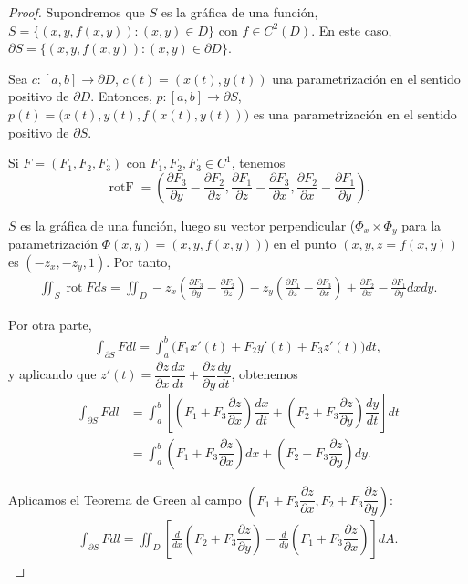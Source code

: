 \documentclass[12pt,spanish]{article}
\theoremstyle{definition}
\theoremstyle{remark}
\begin{document}
\begin{proof}
	Supondremos que $S$ es la gráfica de una función, $S=\{(x,y,f(x,y)): (x,y)\in D\}$ con $f\in C^2(D)$. En este caso, $\partial S=\{(x,y,f(x,y)): (x,y)\in \partial D\}$.
	
	Sea $c:[a,b]\rightarrow \partial D$, $c(t)=(x(t),y(t))$ una parametrización en el sentido positivo de $\partial D$. Entonces, $p:[a,b]\rightarrow \partial S$, $p(t)=\big(x(t),y(t),f(x(t),y(t))\big)$ es una parametrización en el sentido positivo de $\partial S$.
	
	Si $F=(F_1,F_2,F_3)$ con $F_1,F_2,F_3\in C^1$, tenemos
	\[\operatorname{rot F}=\left(\frac{\partial F_3}{\partial y}-\frac{\partial F_2}{\partial z},\frac{\partial F_1}{\partial z}-\frac{\partial F_3}{\partial x},\frac{\partial F_2}{\partial x}-\frac{\partial F_1}{\partial y}\right).\]
	
	$S$ es la gráfica de una función, luego su vector perpendicular \big($\Phi_x\times \Phi_y$ para la parametrización $\Phi(x,y)=(x,y,f(x,y))$\big) en el punto $(x,y,z=f(x,y))$ es $(-z_x,-z_y,1)$. Por tanto,
	\begin{align*}
	\iint_S \operatorname{rot}F ds=\iint_D -z_x\left(\frac{\partial F_3}{\partial y}-\frac{\partial F_2}{\partial z}\right) -z_y\left(\frac{\partial F_1}{\partial z}-\frac{\partial F_3}{\partial x}\right)+\frac{\partial F_2}{\partial x}-\frac{\partial F_1}{\partial y} dx dy.
	\end{align*}
	
	Por otra parte,
	\begin{align*}
	\int_{\partial S} F dl=\int_a^b \big(F_1 x'(t) + F_2 y'(t) + F_3 z'(t)\big) dt,
	\end{align*}
	y aplicando que $z'(t)=\dfrac{\partial z}{\partial x}\dfrac{d x}{d t}+\dfrac{\partial z}{\partial y}\dfrac{d y}{d t}$, obtenemos
	\begin{align*}
	\int_{\partial S} F dl&=\int_a^b\left[\left(F_1+F_3\dfrac{\partial z}{\partial x}\right)\dfrac{d x}{d t}+\left(F_2+F_3\dfrac{\partial z}{\partial y}\right)\dfrac{d y}{d t}\right]dt \\
	&=\int_a^b\left(F_1+F_3\dfrac{\partial z}{\partial x}\right)d x+\left(F_2+F_3\dfrac{\partial z}{\partial y}\right)d y.
	\end{align*}
	
	Aplicamos el Teorema de Green al campo $\left(F_1+F_3\dfrac{\partial z}{\partial x},F_2+F_3\dfrac{\partial z}{\partial y}\right)$:
	\begin{align*}
	\int_{\partial S} F dl=\iint_D\left[\frac{d}{d x}\left(F_2+F_3\dfrac{\partial z}{\partial y}\right)-\frac{d}{d y}\left(F_1+F_3\dfrac{\partial z}{\partial x}\right)\right]dA.
	\end{align*}
	

\end{proof}
\end{document}
